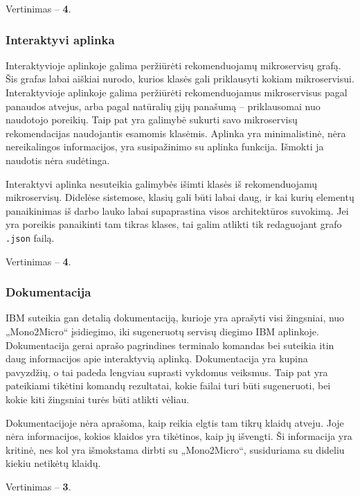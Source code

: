 \documentclass{VUMIFPSbakalaurinis}
\begin{document}
Vertinimas -- \textbf{4}.

\subsubsection{Interaktyvi aplinka}
Interaktyvioje aplinkoje galima peržiūrėti rekomenduojamų mikroservisų grafą. Šis grafas labai aiškiai nurodo, kurios klasės gali priklausyti kokiam mikroservisui. Interaktyvioje aplinkoje galima peržiūrėti rekomenduojamus mikroservisus pagal panaudos atvejus, arba pagal natūralių gijų panašumą -- priklausomai nuo naudotojo poreikių. Taip pat yra galimybė sukurti savo mikroservisų rekomendacijas naudojantis esamomis klasėmis. Aplinka yra minimalistinė, nėra nereikalingos informacijos, yra susipažinimo su aplinka funkcija. Išmokti ja naudotis nėra sudėtinga.

Interaktyvi aplinka nesuteikia galimybės išimti klasės iš rekomenduojamų mikroservisų. Didelėse sistemose, klasių gali būti labai daug, ir kai kurių elementų panaikinimas iš darbo lauko labai supaprastina visos architektūros suvokimą. Jei yra poreikis panaikinti tam tikras klases, tai galim atlikti tik redaguojant grafo \verb|.json| failą.

Vertinimas -- \textbf{4}.

\subsubsection{Dokumentacija}
IBM suteikia gan detalią dokumentaciją, kurioje yra aprašyti visi žingsniai, nuo „Mono2Micro“ įsidiegimo, iki sugeneruotų servisų diegimo IBM aplinkoje. Dokumentacija gerai aprašo pagrindines terminalo komandas bei suteikia itin daug informacijos apie interaktyvią aplinką. Dokumentacija yra kupina pavyzdžių, o tai padeda lengviau suprasti vykdomus veiksmus. Taip pat yra pateikiami tikėtini komandų rezultatai, kokie failai turi būti sugeneruoti, bei kokie kiti žingsniai turės būti atlikti vėliau.

Dokumentacijoje nėra aprašoma, kaip reikia elgtis tam tikrų klaidų atveju. Joje nėra informacijos, kokios klaidos yra tikėtinos, kaip jų išvengti. Ši informacija yra kritinė, nes kol yra išmokstama dirbti su „Mono2Micro“, susiduriama su dideliu kiekiu netikėtų klaidų.

Vertinimas -- \textbf{3}.
\end{document}
